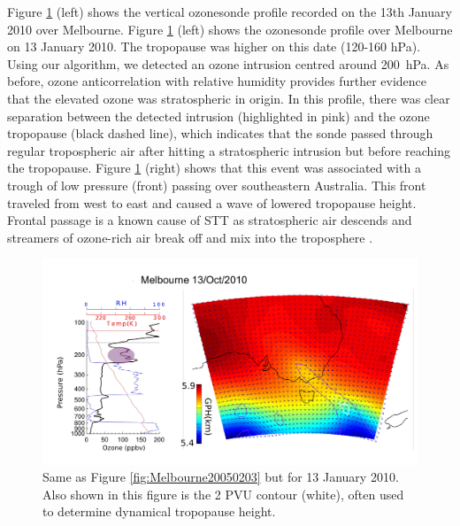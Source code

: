 \documentclass{article}
\begin{document}
  Figure \ref{fig:Melbourne20100113} (left) shows the vertical ozonesonde profile recorded on the 13th January 2010 over Melbourne.
  Figure \ref{fig:Melbourne20100113} (left) shows the ozonesonde profile over Melbourne on 13 January 2010.
  The tropopause was higher on this date (120-160 hPa).
  Using our algorithm, we detected an ozone intrusion centred around 200~hPa.
  As before, ozone anticorrelation with relative humidity provides further evidence that the elevated ozone was stratospheric in origin.
  In this profile, there was clear separation between the detected intrusion (highlighted in pink) and the ozone tropopause (black dashed line), which indicates that the sonde passed through regular tropospheric air after hitting a stratospheric intrusion but before reaching the tropopause.
  Figure \ref{fig:Melbourne20100113} (right) shows that this event was associated with a trough of low pressure (front) passing over southeastern Australia.
  This front traveled from west to east and caused a wave of lowered tropopause height. 
  Frontal passage is a known cause of STT as stratospheric air descends and streamers of ozone-rich air break off and mix into the troposphere \citep{Sprenger2003}.
  
  \begin{figure}[!htbp]
    \begin{center}
    \includegraphics[width=1.0\columnwidth]{figures/Melbourne20100113.png}
    \caption{Same as Figure \ref{fig:Melbourne20050203} but for 13 January 2010.
      Also shown in this figure is the 2 PVU contour (white), often used to determine dynamical tropopause height.}
    \label{fig:Melbourne20100113}
    \end{center}
  \end{figure}
\end{document}
